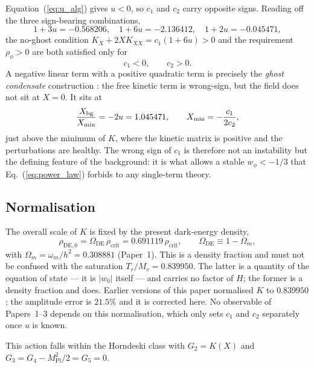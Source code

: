 \documentclass[12pt,a4paper]{article}
\newcommand{\Mpl}{M_{\mathrm{Pl}}}
\newcommand{\Omde}{\Omega_{\mathrm{DE}}}
\newcommand{\Omm}{\Omega_{m}}
\newcommand{\rhocrit}{\rho_{\mathrm{crit}}}
\begin{document}
Equation~(\ref{eq:u_alg}) gives $u<0$, so $c_1$ and $c_2$ carry opposite
signs.  Reading off the three sign-bearing combinations,
%
\begin{equation}
  1+3u = -0.568206,\quad
  1+6u = -2.136412,\quad
  1+2u = -0.045471,
\end{equation}
%
the no-ghost condition $K_X+2XK_{XX} = c_1(1+6u) > 0$ and the requirement
$\rho_\phi>0$ are both satisfied only for
%
\begin{equation}
  c_1 < 0, \qquad c_2 > 0.
\end{equation}
%
A negative linear term with a positive quadratic term is precisely the
\emph{ghost condensate} construction \citep{ArkaniHamed2004}: the free
kinetic term is wrong-sign, but the field does not sit at $X=0$.  It sits
at
%
\begin{equation}
  \frac{X_{\rm bg}}{X_{\min}} = -2u = 1.045471,
  \qquad X_{\min} = -\frac{c_1}{2c_2},
  \label{eq:condensate}
\end{equation}
%
just above the minimum of $K$, where the kinetic matrix is positive and
the perturbations are healthy.  The wrong sign of $c_1$ is therefore not
an instability but the defining feature of the background: it is what
allows a stable $w_\phi<-1/3$ that Eq.~(\ref{eq:power_law}) forbids to
any single-term theory.

\subsection{Normalisation}

The overall scale of $K$ is fixed by the present dark-energy density,
%
\begin{equation}
  \rho_{\mathrm{DE},0} = \Omde\,\rhocrit = 0.691119\,\rhocrit,
  \qquad \Omde \equiv 1 - \Omm,
  \label{eq:norm}
\end{equation}
%
with $\Omm = \omega_m/h^2 = 0.308881$ (Paper~1).  This is a density
fraction and must not be confused with the saturation $T_r/M_v =
0.839950$.  The latter is a quantity of the equation of state --- it is
$|w_0|$ itself --- and carries no factor of $H$; the former is a density
fraction and does.  Earlier
versions of this paper normalised $K$ to $0.839950$; the amplitude error
is $21.5\%$ and it is corrected here.  No observable of Papers~1--3
depends on this normalisation, which only sets $c_1$ and $c_2$
separately once $u$ is known.

This action falls within the Horndeski class
\citep{horndeski1974,Gubitosi2013,bellini2014} with $G_2 = K(X)$ and
$G_3 = G_4 - \Mpl^2/2 = G_5 = 0$.
\end{document}
